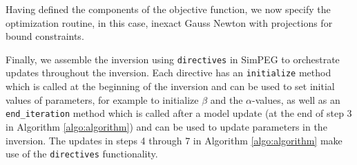 \documentclass[extra, mreferee]{gji_joint} %
\begin{document}





Having defined the components of the objective function, we now specify the optimization routine, in this case, inexact Gauss Newton with projections for bound constraints.




Finally, we assemble the inversion using \texttt{directives} in SimPEG to orchestrate updates throughout the inversion. Each directive has an \texttt{initialize} method which is called at the beginning of the inversion and can be used to set initial values of parameters, for example to initialize $\beta$ and the $\alpha$-values, as well as an \texttt{end\_iteration} method which is called after a model update (at the end of step 3 in Algorithm \ref{algo:algorithm}) and can be used to update parameters in the inversion. The updates in steps 4 through 7 in Algorithm \ref{algo:algorithm} make use of the \texttt{directives} functionality.

\end{document}
